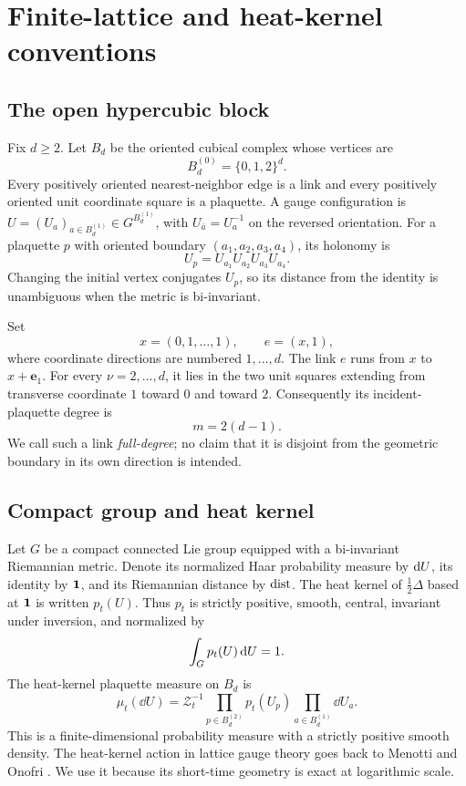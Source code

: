 \section{Finite-lattice and heat-kernel conventions}\label{sec:setup}

\subsection{The open hypercubic block}

Fix $d\geq2$.  Let $B_d$ be the oriented cubical complex whose vertices are
\[
  B_d^{(0)}=\{0,1,2\}^d.
\]
Every positively oriented nearest-neighbor edge is a link and every positively
oriented unit coordinate square is a plaquette.  A gauge configuration is
$U=(U_a)_{a\in B_d^{(1)}}\in G^{B_d^{(1)}}$, with
$U_{\bar a}=U_a^{-1}$ on the reversed orientation.  For a plaquette $p$ with
oriented boundary $(a_1,a_2,a_3,a_4)$, its holonomy is
\[
  U_p=U_{a_1}U_{a_2}U_{a_3}U_{a_4}.
\]
Changing the initial vertex conjugates $U_p$, so its distance from the
identity is unambiguous when the metric is bi-invariant.

Set
\[
  x=(0,1,\ldots,1),\qquad e=(x,1),
\]
where coordinate directions are numbered $1,\ldots,d$.  The link $e$ runs
from $x$ to $x+\mathbf e_1$.  For every $\nu=2,\ldots,d$, it lies in the two
unit squares extending from transverse coordinate $1$ toward $0$ and toward
$2$.  Consequently its incident-plaquette degree is
\begin{equation}\label{eq:m-definition}
  m=2(d-1).
\end{equation}
We call such a link \emph{full-degree}; no claim that it is disjoint from the
geometric boundary in its own direction is intended.

\subsection{Compact group and heat kernel}

Let $G$ be a compact connected Lie group equipped with a bi-invariant
Riemannian metric.  Denote its normalized Haar probability measure by
$\mathrm dU$, its identity by $\mathbf 1$, and its Riemannian distance by $\operatorname{dist}$.
The heat kernel of $\tfrac12\Delta$ based at $\mathbf 1$ is written $p_t(U)$.
Thus $p_t$ is strictly positive, smooth, central, invariant under inversion,
and normalized by
\[
  \int_G p_t(U)\,\mathrm dU=1.
\]
The heat-kernel plaquette measure on $B_d$ is
\begin{equation}\label{eq:finite-measure}
 \mu_t(\dd U)=\mathcal Z_t^{-1}
 \prod_{p\in B_d^{(2)}}p_t(U_p)
 \prod_{a\in B_d^{(1)}}\dd U_a.
\end{equation}
This is a finite-dimensional probability measure with a strictly positive
smooth density.  The heat-kernel action in lattice gauge theory goes back to
Menotti and Onofri \cite{MenottiOnofri1981}.  We use it because its
short-time geometry is exact at logarithmic scale.

